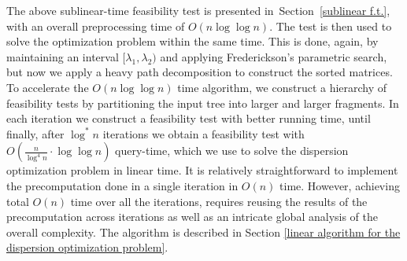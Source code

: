 \documentclass[11pt,a4paper]{article}
\theoremstyle{definition}
\theoremstyle{remark}
\begin{document}
The above sublinear-time feasibility test is presented in~Section~\ref{sublinear f.t.}, with an overall preprocessing time of $O(n\log\log n)$.
The test is then used to solve the optimization problem within the same time. This is done, again, by maintaining an interval
$[\lambda_{1},\lambda_{2})$ and applying Frederickson's parametric search, but now we apply a heavy path decomposition to construct
the sorted matrices.
To accelerate the $O(n\log\log n)$ time algorithm, we construct a hierarchy of feasibility tests by partitioning the input tree
into larger and larger fragments. In each iteration we construct a feasibility test with better running time, until finally, after $\log^*n$ iterations
we obtain a feasibility test with $O(\frac{n}{\log ^4n} \cdot \log \log n)$ query-time, which we use to solve the dispersion optimization problem in linear  time. It is relatively straightforward to implement the precomputation done in a single iteration in $O(n)$ time. However, achieving total $O(n)$ time over all the iterations, requires reusing the results of the precomputation across iterations as well as an intricate global analysis of the overall complexity.
The algorithm is described in Section \ref{linear algorithm for the dispersion optimization problem}.
\end{document}
